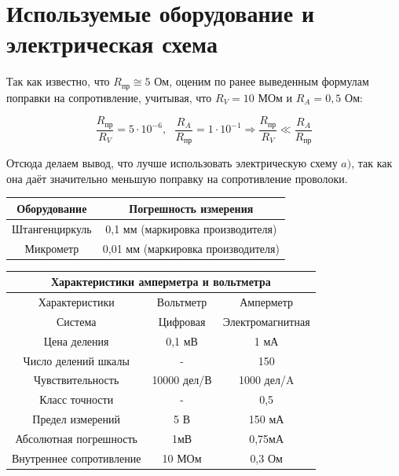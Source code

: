\section{Используемые оборудование и электрическая схема}

Так как известно, что $R_{\text{пр}}\cong 5$ Ом, оценим по ранее выведенным формулам поправки на сопротивление, учитывая, что $R_V = 10$ МОм и $R_A = 0,5$ Ом:

\[\frac{R_{\text{пр}}}{R_V} = 5 \cdot 10^{-6}, \text{ } \frac{R_A}{R_{\text{пр}}} = 1 \cdot 10^{-1} \Rightarrow \frac{R_{\text{пр}}}{R_V} \ll \frac{R_A}{R_{\text{пр}}}\]

Отсюда делаем вывод, что лучше использовать электрическую схему $a)$, так как она даёт значительно меньшую поправку на сопротивление проволоки.

\begin{center}
    \begin{tabular}{|c|c|}
        \hline
        Оборудование   & Погрешность измерения              \\
        \hline
        Штангенциркуль & 0,1 мм (маркировка производителя)  \\
        \hline
        Микрометр      & 0,01 мм (маркировка производителя) \\
        \hline
    \end{tabular}
\end{center}

\begin{center}
    \begin{tabular}{|c|c|c|}
        \hline
        \multicolumn{3}{|c|}{Характеристики амперметра и вольтметра} \\
        \hline
        Характеристики           & Вольтметр   & Амперметр           \\
        \hline
        Система                  & Цифровая    & Электромагнитная    \\
        \hline
        Цена деления             & 0,1 мВ      & 1 мА                \\
        \hline
        Число делений шкалы      & -           & 150                 \\
        \hline
        Чувствительность         & 10000 дел/В & 1000 дел/A          \\
        \hline
        Класс точности           & -           & 0,5                 \\
        \hline
        Предел измерений         & 5 В         & 150 мА              \\
        \hline
        Абсолютная погрешность   & 1мВ         & 0,75мА              \\
        \hline
        Внутреннее сопротивление & 10 МОм      & 0,3 Ом              \\
        \hline
    \end{tabular}
\end{center}
\newpage

